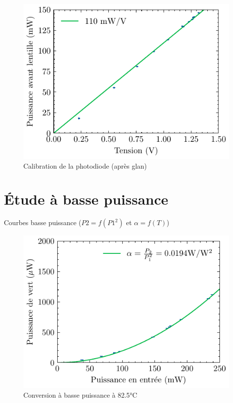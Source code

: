 \documentclass[11pt,a4paper] { article}
\begin{document}
\begin{figure}[h]
    \centering
    \includegraphics{../donnees/calib photodiode.pdf}
    \caption{Calibration de la photodiode (après glan)}
\end{figure}


\section{Étude à basse puissance}
Courbes basse puissance ($P2=f(P1^2)$ et $\alpha = f(T)$)

\begin{figure}[h]
    \centering
    \includegraphics{../donnees/conversion basse puissance 82.5 C.pdf}
    \caption{Conversion à basse puissance à 82.5°C}
\end{figure}
\end{document}
